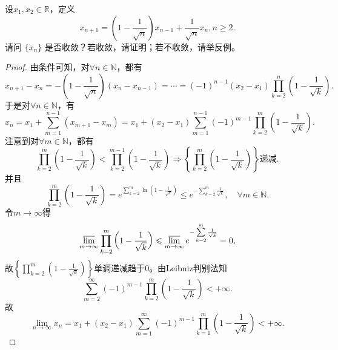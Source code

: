 \documentclass[../../main.tex]{subfiles}%
\begin{document}
\begin{example}
设$x_1, x_2 \in \mathbb{R}$，定义
$$x_{n+1} = \left(1 - \frac{1}{\sqrt{n}}\right)x_{n-1} + \frac{1}{\sqrt{n}}x_n, n \geqslant 2.$$
请问 $\{x_n\}$ 是否收敛？若收敛，请证明；若不收敛，请举反例。
\end{example}
\begin{proof}
由条件可知，对$\forall n\in \mathbb{N}$，都有
$$x_{n+1} - x_n = -\left(1 - \frac{1}{\sqrt{n}}\right)\left(x_n - x_{n-1}\right) = \cdots = (-1)^{n-1}\left(x_2 - x_1\right)\prod_{k=2}^n \left(1 - \frac{1}{\sqrt{k}}\right).$$
于是对$\forall n\in \mathbb{N}$，有
$$x_n = x_1 + \sum\limits_{m=1}^{n-1} \left(x_{m+1} - x_m\right) = x_1 + \left(x_2 - x_1\right)\sum\limits_{m=1}^{n-1} (-1)^{m-1}\prod_{k=2}^m \left(1 - \frac{1}{\sqrt{k}}\right).$$
注意到对$\forall m\in \mathbb{N}$，都有
$$\prod_{k=2}^m \left(1 - \frac{1}{\sqrt{k}}\right) < \prod_{k=2}^{m-1} \left(1 - \frac{1}{\sqrt{k}}\right) \Longrightarrow \left\{ \prod_{k=2}^m \left(1 - \frac{1}{\sqrt{k}}\right) \right\} \text{递减}.$$
并且
$$\prod_{k=2}^m \left(1 - \frac{1}{\sqrt{k}}\right) = e^{\sum\limits_{k=2}^m \ln\left(1 - \frac{1}{\sqrt{k}}\right)} \leqslant e^{-\sum\limits_{k=2}^m \frac{1}{\sqrt{k}}}, \quad \forall m\in \mathbb{N}.$$
令$m\rightarrow \infty$得
$$\varlimsup_{m\rightarrow \infty} \prod_{k=2}^m \left(1 - \frac{1}{\sqrt{k}}\right) \leqslant \varlimsup_{m\rightarrow \infty} e^{-\sum\limits_{k=2}^m \frac{1}{\sqrt{k}}} = 0,$$
故$\left\{ \prod_{k=2}^m \left(1 - \frac{1}{\sqrt{k}}\right) \right\}$单调递减趋于$0$。由Leibniz判别法知
$$\sum\limits_{m=2}^{\infty} (-1)^{m-1}\prod_{k=2}^m \left(1 - \frac{1}{\sqrt{k}}\right) < +\infty.$$
故
$$\lim_{n\rightarrow \infty} x_n = x_1 + \left(x_2 - x_1\right)\sum\limits_{m=1}^{\infty} (-1)^{m-1}\prod_{k=1}^m \left(1 - \frac{1}{\sqrt{k}}\right) < +\infty.$$
\end{proof}
\end{document}
